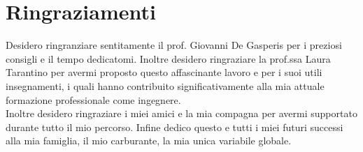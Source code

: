 \chapter*{Ringraziamenti}
\thispagestyle{empty}

Desidero ringranziare sentitamente il prof. Giovanni De Gasperis per i preziosi consigli e il tempo dedicatomi. Inoltre desidero ringraziare la prof.ssa Laura Tarantino per avermi proposto questo affascinante lavoro e per i suoi utili insegnamenti, i quali hanno contribuito significativamente alla mia attuale formazione professionale come ingegnere.\\
Inoltre desidero ringraziare i miei amici e la mia compagna per avermi supportato durante tutto il mio percorso. Infine dedico questo e tutti i miei futuri successi alla mia famiglia, il mio carburante, la mia unica variabile globale.
